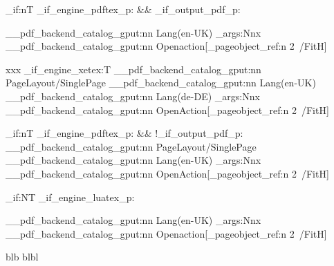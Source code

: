 \documentclass{article}
\begin{document}
\ExplSyntaxOn

\bool_if:nT {\sys_if_engine_pdftex_p: && \sys_if_output_pdf_p: }
{
 \__pdf_backend_catalog_gput:nn {Lang}{(en-UK)}
 \exp_args:Nnx 
 \__pdf_backend_catalog_gput:nn {Openaction}{[\pdf_pageobject_ref:n {2}~/FitH]}
 
}
xxx
\sys_if_engine_xetex:T
{
\__pdf_backend_catalog_gput:nn {PageLayout}{/SinglePage}
 \__pdf_backend_catalog_gput:nn {Lang}{(en-UK)}
 \__pdf_backend_catalog_gput:nn {Lang}{(de-DE)}
\exp_args:Nnx 
\__pdf_backend_catalog_gput:nn {OpenAction}{[\pdf_pageobject_ref:n {2}~/FitH]}
}

\bool_if:nT {\sys_if_engine_pdftex_p: && !\sys_if_output_pdf_p: }
{
  \__pdf_backend_catalog_gput:nn {PageLayout}{/SinglePage}
  \__pdf_backend_catalog_gput:nn {Lang}{(en-UK)}
  \exp_args:Nnx
\__pdf_backend_catalog_gput:nn {OpenAction}{[\pdf_pageobject_ref:n {2}~/FitH]}
}

\bool_if:NT {\sys_if_engine_luatex_p:}
{
\__pdf_backend_catalog_gput:nn {Lang}{(en-UK)}
 \exp_args:Nnx
 \__pdf_backend_catalog_gput:nn {Openaction}{[\pdf_pageobject_ref:n {2}~/FitH]}
 
}
\newpage blb
\newpage blbl
\ExplSyntaxOff
\end{document}
